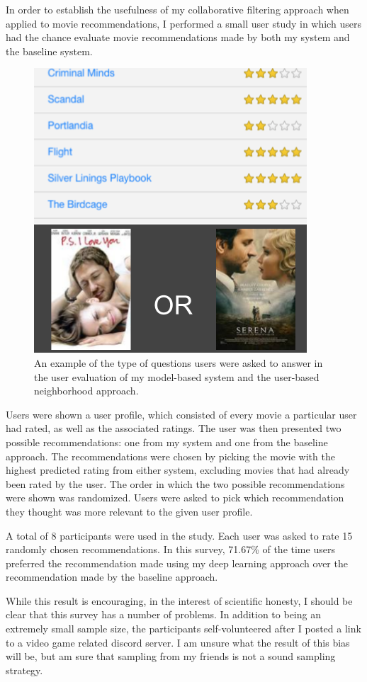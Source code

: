\documentclass[12pt]{article}
\begin{document}
In order to establish the usefulness of my collaborative filtering approach
when applied to movie recommendations, I performed a small user study in which
users had the chance evaluate movie recommendations made by both my system and
the baseline system.

\begin{figure}
\centering
\includegraphics[width=.5\textwidth]{user}
\caption{An example of the type of questions users were asked to answer in the
user evaluation of my model-based system and the user-based neighborhood
approach.}
\end{figure}

Users were shown a user profile, which consisted of every movie a particular user
had rated, as well as the associated ratings.
The user was then presented two possible recommendations: one from my system
and one from the baseline approach.
The recommendations were chosen by picking the movie with the highest predicted
rating from either system, excluding movies that had already been rated by the
user.
The order in which the two possible recommendations were shown was randomized.
Users were asked to pick which recommendation they thought was more relevant
to the given user profile.

A total of 8 participants were used in the study.
Each user was asked to rate 15 randomly chosen recommendations.
In this survey, 71.67\% of the time users preferred the recommendation made
using my deep learning approach over the recommendation made by the baseline
approach.

While this result is encouraging, in the interest of scientific honesty, I
should be clear that this survey has a number of problems.
In addition to being an extremely small sample size,
the participants self-volunteered after I posted a link to a video
game related discord server.
I am unsure what the result of this bias will be, but am sure that sampling
from my friends is not a sound sampling strategy.
\end{document}
